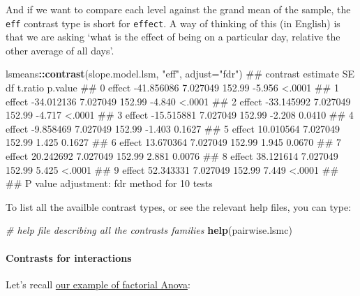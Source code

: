 \documentclass[]{article}
\newenvironment{Shaded}{\begin{snugshade}}{\end{snugshade}}
\newcommand{\KeywordTok}[1]{\textcolor[rgb]{0.13,0.29,0.53}{\textbf{#1}}}
\newcommand{\DataTypeTok}[1]{\textcolor[rgb]{0.13,0.29,0.53}{#1}}
\newcommand{\DecValTok}[1]{\textcolor[rgb]{0.00,0.00,0.81}{#1}}
\newcommand{\StringTok}[1]{\textcolor[rgb]{0.31,0.60,0.02}{#1}}
\newcommand{\CommentTok}[1]{\textcolor[rgb]{0.56,0.35,0.01}{\textit{#1}}}
\newcommand{\OperatorTok}[1]{\textcolor[rgb]{0.81,0.36,0.00}{\textbf{#1}}}
\newcommand{\NormalTok}[1]{#1}
\let\oldparagraph\paragraph
\renewcommand{\paragraph}[1]{\oldparagraph{#1}\mbox{}}
\theoremstyle{definition}
\theoremstyle{definition}
\theoremstyle{definition}
\theoremstyle{remark}
\begin{document}
And if we want to compare each level against the grand mean of the
sample, the \texttt{eff} contrast type is short for \texttt{effect}. A
way of thinking of this (in English) is that we are asking `what is the
effect of being on a particular day, relative the other average of all
days'.

\begin{Shaded}
\begin{Highlighting}[]
\NormalTok{lsmeans}\OperatorTok{::}\KeywordTok{contrast}\NormalTok{(slope.model.lsm, }\StringTok{"eff"}\NormalTok{, }\DataTypeTok{adjust=}\StringTok{"fdr"}\NormalTok{)}
\NormalTok{##  contrast   estimate       SE     df t.ratio p.value}
\NormalTok{##  0 effect -41.856086 7.027049 152.99  -5.956  <.0001}
\NormalTok{##  1 effect -34.012136 7.027049 152.99  -4.840  <.0001}
\NormalTok{##  2 effect -33.145992 7.027049 152.99  -4.717  <.0001}
\NormalTok{##  3 effect -15.515881 7.027049 152.99  -2.208  0.0410}
\NormalTok{##  4 effect  -9.858469 7.027049 152.99  -1.403  0.1627}
\NormalTok{##  5 effect  10.010564 7.027049 152.99   1.425  0.1627}
\NormalTok{##  6 effect  13.670364 7.027049 152.99   1.945  0.0670}
\NormalTok{##  7 effect  20.242692 7.027049 152.99   2.881  0.0076}
\NormalTok{##  8 effect  38.121614 7.027049 152.99   5.425  <.0001}
\NormalTok{##  9 effect  52.343331 7.027049 152.99   7.449  <.0001}
\NormalTok{## }
\NormalTok{## P value adjustment: fdr method for 10 tests}
\end{Highlighting}
\end{Shaded}

To list all the availble contrast types, or see the relevant help files,
you can type:

\begin{Shaded}
\begin{Highlighting}[]
\CommentTok{# help file describing all the contrasts families}
\KeywordTok{help}\NormalTok{(pairwise.lsmc)}
\end{Highlighting}
\end{Shaded}

\paragraph{Contrasts for
interactions}\label{interaction-pairwise-contrasts}

Let's recall \protect\hyperlink{howell-factorial-example}{our example of
factorial Anova}:

\begin{Shaded}
\end{Shaded}
\end{document}
